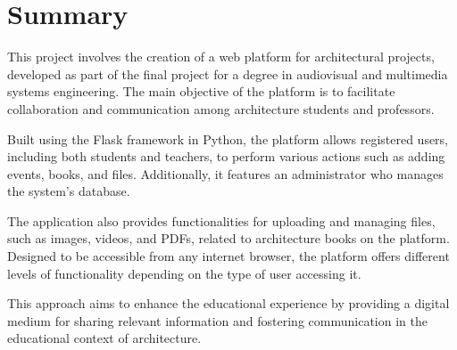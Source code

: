 \documentclass[a4paper, 12pt]{book}
\begin{document}

\chapter*{Summary}

This project involves the creation of a web platform for architectural projects, developed as part
 of the final project for a degree in audiovisual and multimedia systems engineering. The main 
 objective of the platform is to facilitate collaboration and communication among architecture students 
 and professors. 
 
 Built using the Flask framework in Python, the platform allows registered users, including both students 
 and teachers, to perform various actions such as adding events, books, and files. Additionally, it features 
 an administrator who manages the system's database. 
 
 The application also provides functionalities for uploading and managing files, such as images, videos, 
 and PDFs, related to architecture books on the platform. Designed to be accessible from any internet browser, 
 the platform offers different levels of functionality depending on the type of user accessing it. 
 
 This approach aims to enhance the educational experience by providing a digital medium for sharing relevant 
 information and fostering communication in the educational context of architecture.



\tableofcontents 
\cleardoublepage
\listoffigures %
\end{document}

